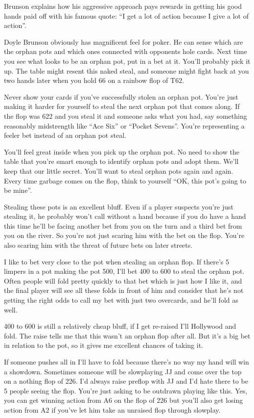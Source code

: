 Brunson explains how his aggressive approach pays rewards
in getting his good hands paid off with his famous quote:
``I get a lot of action because I give a lot of action''.

Doyle Brunson obviously has magnificent feel for poker. He can
sense which are the orphan pots and which ones connected with
opponents hole cards. Next time you see what looks to be an orphan
pot, put in a bet at it. You'll probably pick it up. The table might
resent this naked steal, and someone might fight back at you two hands
later when you hold 66 on a rainbow flop of T62.

Never show your cards if you've successfully stolen an orphan pot.
You're just making it harder for yourself to steal the next
orphan pot that comes along. If the flop was 622 and you steal it
and someone asks what you had, say something reasonably midstrength
like ``Ace Six'' or ``Pocket Sevens''. You're representing a feeler bet
instead of an orphan pot steal.

You'll feel great inside when you pick up the orphan pot. No need
to show the table that you're smart enough to identify orphan
pots and adopt them. We'll keep that our little secret. You'll want to
steal orphan pots again and again. Every time garbage comes on the flop,
think to yourself ``OK, this pot's going to be mine''.

Stealing these pots is an excellent bluff. Even if a player
suspects you're just stealing it, he probably won't call without
a hand because if you do have a hand this time he'll be facing
another bet from you on the turn and a third bet from you on the
river. So you're not just scaring him with the bet on the flop.
You're also scaring him with the threat of future bets on later
streets.

I like to bet very close to the pot when stealing an orphan flop.
If there's 5 limpers in a pot making the pot 500, I'll bet 400 to 600
to steal the orphan pot. Often people will fold pretty quickly to that
bet which is just how I like it, and the final player will see all these
folds in front of him and consider that he's not getting the right odds
to call my bet with just two overcards, and he'll fold as well.

400 to 600 is still a relatively cheap bluff, if I get re-raised I'll
Hollywood and fold. The raise tells me that this wasn't an orphan flop
after all. But it's a big bet in relation to the pot, so it
gives me excellent chances of taking it.

If someone pushes all in I'll have to fold because there's no way my
hand will win a showdown. Sometimes someone will be
slowplaying JJ and come over the top on a nothing flop of 226. I'd always
raise preflop with JJ and I'd hate there to be 5 people seeing the flop.
You're just asking to be outdrawn playing like this. Yes, you can get
winning action from A6 on the flop of 226 but you'll also get
losing action from A2 if you've let him take an unraised flop
through slowplay.

